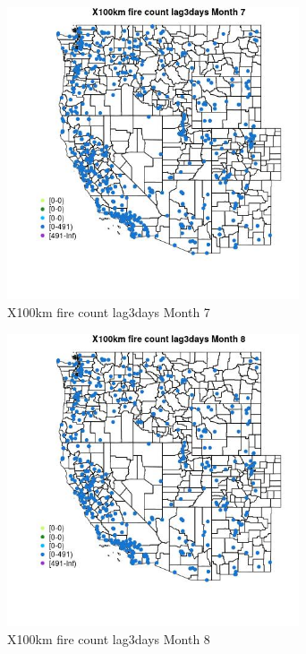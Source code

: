 \begin{figure} 
\centering  
\includegraphics[width=0.77\textwidth]{Code_Outputs/Report_ML_input_PM25_Step4_part_e_de_duplicated_aves_compiled_2019-05-14wNAs_MapObsMo7X100km_fire_count_lag3days.jpg} 
\caption{\label{fig:Report_ML_input_PM25_Step4_part_e_de_duplicated_aves_compiled_2019-05-14wNAsMapObsMo7X100km_fire_count_lag3days}X100km fire count lag3days Month 7} 
\end{figure} 
 

\clearpage 

\begin{figure} 
\centering  
\includegraphics[width=0.77\textwidth]{Code_Outputs/Report_ML_input_PM25_Step4_part_e_de_duplicated_aves_compiled_2019-05-14wNAs_MapObsMo8X100km_fire_count_lag3days.jpg} 
\caption{\label{fig:Report_ML_input_PM25_Step4_part_e_de_duplicated_aves_compiled_2019-05-14wNAsMapObsMo8X100km_fire_count_lag3days}X100km fire count lag3days Month 8} 
\end{figure} 
 


